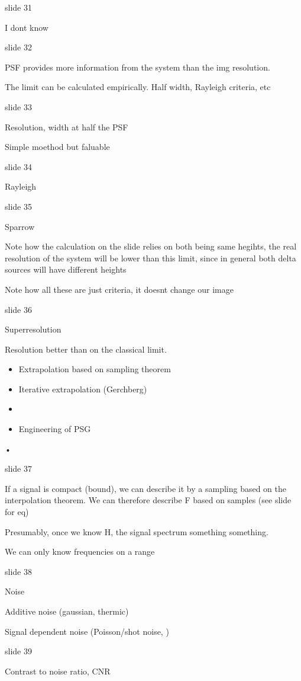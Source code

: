 \documentclass[../main/main.tex]{subfiles}
\begin{document}
slide 31

I dont know

slide 32

PSF provides more information from the system than the img resolution.

The limit can be calculated empirically. Half width, Rayleigh criteria, etc

slide 33

Resolution, width at half the PSF

Simple moethod but faluable

slide 34

Rayleigh

slide 35

Sparrow

Note how the calculation on the slide relies on both being same hegihts, the real resolution of the system will be lower than this limit, since in general both delta sources will have different heights

Note how all these are just criteria, it doesnt change our image


slide 36

Superresolution

Resolution better than on the classical limit.

\begin{itemize}
	\item Extrapolation based on sampling theorem
	\item Iterative extrapolation (Gerchberg)
	\item
	\item Engineering of PSG

\end{itemize}•


slide 37

If a signal is compact (bound), we can describe it by a sampling based on the interpolation theorem. We can therefore describe F based on samples (see slide for eq)

Presumably, once we know H, the signal spectrum something something.

We can only know frequencies on a range


slide 38

Noise

Additive noise (gaussian, thermic)

Signal dependent noise (Poisson/shot noise, )

slide 39

Contrast to noise ratio, CNR
\end{document}
